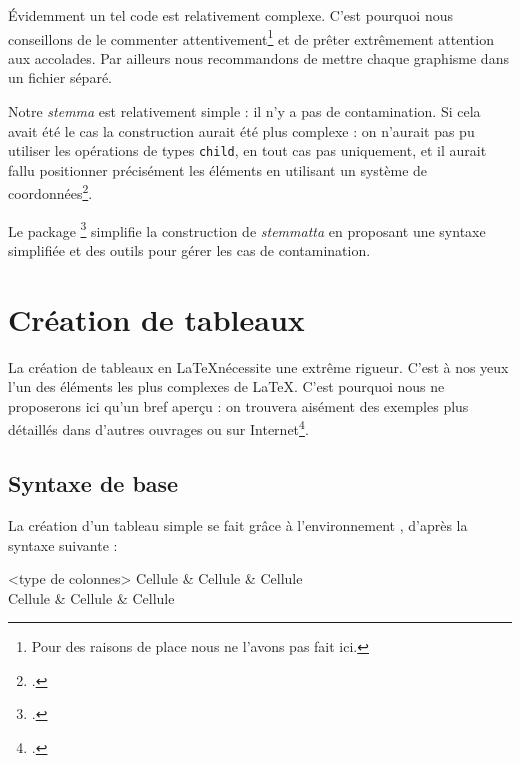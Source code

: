 Évidemment un tel code est relativement complexe. C'est pourquoi nous conseillons de le commenter attentivement\footnote{Pour des raisons de place nous ne l'avons pas fait ici.} et de prêter extrêmement attention  aux accolades. Par ailleurs nous recommandons de mettre chaque graphisme  dans un fichier séparé.


Notre \emph{stemma} est relativement simple : il n'y a pas de contamination. Si cela avait été le cas la construction aurait été plus complexe : on n'aurait pas pu utiliser les opérations de types \verb|child|, en tout cas pas uniquement,  et il aurait fallu positionner précisément les éléments en utilisant un système de coordonnées\footcites[Nous avons publié sur notre site Internet une série d'articles sur les \emph{stemma} avec TikZ :][]{stemma}[on consultera avec profit un article écrit dans la langue de Dante][]{Leal2012a}.

\begin{plusloins}
Le package \footcite{tikz-qtree} simplifie la construction de \emph{stemmatta} en proposant une syntaxe simplifiée et des outils pour gérer les cas de contamination.  
\end{plusloins}


\section{Création de tableaux}

\begin{attention}
La création de tableaux en \LaTeX nécessite  une extrême rigueur. 
C'est à nos yeux l'un des éléments les plus complexes de \LaTeX. C'est pourquoi nous ne proposerons ici qu'un bref aperçu : on trouvera aisément des exemples plus détaillés dans d'autres ouvrages ou sur Internet\footcite[On pourra consulter des fichiers assez didactiques :][]{bebert_tableaux}.
\end{attention}

\subsection{Syntaxe de base}

La création d'un tableau simple se fait grâce à l'environnement , d'après la syntaxe suivante :

\begin{latexcode}
\begin{tabular}{<type de colonnes>}
    Cellule & Cellule & Cellule \\
    Cellule & Cellule & Cellule \\
\end{tabular}
\end{latexcode}

